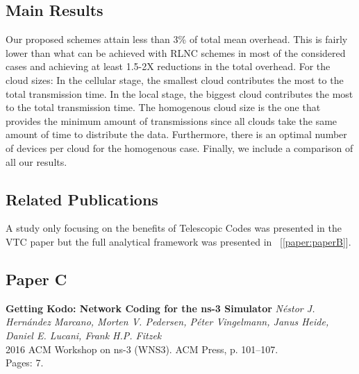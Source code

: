 \subsection*{Main Results}
Our proposed schemes attain less than 3\% of total mean overhead. This is fairly lower than what can be achieved with \ac{RLNC} schemes in most of the considered cases and achieving at least 1.5-2X reductions in the total overhead. For the cloud sizes: In the cellular stage, the smallest cloud contributes the most to the total transmission time. In the local stage, the biggest cloud contributes the most to the total transmission time. The homogenous cloud size is the one that provides the minimum amount of transmissions since all clouds take the same amount of time to distribute the data. Furthermore, there is an optimal number of devices per cloud for the homogenous case. Finally, we include a comparison of all our results. 

\subsection*{Related Publications}
A study only focusing on the benefits of Telescopic Codes was presented in the VTC paper but the full analytical framework was presented in ~[\ref{paper:paperB}].

\clearpage


\subsection{Paper C}
\textbf{Getting Kodo: Network Coding for the ns-3 Simulator}
\textit{N\'estor J. Hern\'andez Marcano, Morten V. Pedersen, P\'eter
Vingelmann, Janus Heide, Daniel E. Lucani, Frank H.P. Fitzek}
\\ 2016 ACM Workshop on ns-3 (WNS3). ACM Press, p. 101--107.
\\ Pages: 7.
